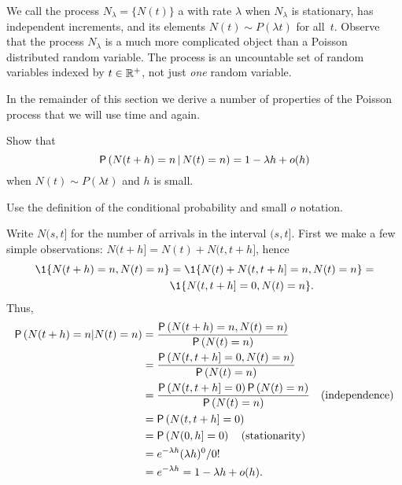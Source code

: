 We call the process $N_\lambda=\{N(t)\}$ a  with rate $\lambda$ when $N_\lambda$ is stationary, has independent increments, and its elements $N(t)\sim P(\lambda t)$ for all~$t$.
Observe that the process $N_\lambda$ is a much more complicated object than a Poisson distributed random variable.
The process is an uncountable set of random variables indexed by $t\in \mathbb{R}^+$, not just \emph{one} random variable.


In the remainder of this section we derive a number of properties of the Poisson process that we will use time and again.


\begin{exercise} 
 Show that 
 \begin{equation*}
\P{N(t+h) = n \given N(t) = n} = 1-\lambda h + o(h)
 \end{equation*}
when $N(t) \sim P(\lambda t)$ and $h$ is small. 
\begin{hint}
Use the definition of the conditional probability and small $o$ notation.

\end{hint}
\begin{solution}
Write $N(s, t]$ for the number of arrivals in the interval $(s,t]$. First we make a few simple observations: $N(t+h]= N(t) + N(t, t+h]$, hence
\begin{align*}
 \1{N(t+h)=n, N(t)=n}
&= \1{N(t) + N(t, t+h] = n, N(t)=n} = \\
&\1{N(t, t+h] = 0, N(t)=n}.
\end{align*}
Thus, 
 \begin{align*}
 \P{N(t+h) = n | N(t) = n} 
&= \frac{\P{N(t+h) = n, N(t) = n}}{\P{N(t)=n}} \\
&= \frac{\P{N(t, t+h] = 0, N(t) = n}}{\P{N(t)=n}} \\
&= \frac{\P{N(t, t+h] = 0} \P{N(t) = n}}{\P{N(t)=n}} \quad \text{(independence)}\\
&= \P{N(t, t+h] = 0} \\
&= \P{N(0, h] = 0} \quad\text{(stationarity)} \\
&= e^{-\lambda h} (\lambda h)^0/0! \\
&= e^{-\lambda h} = 1-\lambda h + o(h).
 \end{align*}
\end{solution}
\end{exercise}

